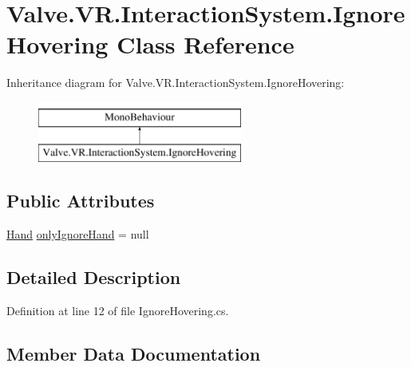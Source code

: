 \hypertarget{class_valve_1_1_v_r_1_1_interaction_system_1_1_ignore_hovering}{}\section{Valve.\+V\+R.\+Interaction\+System.\+Ignore\+Hovering Class Reference}
\label{class_valve_1_1_v_r_1_1_interaction_system_1_1_ignore_hovering}
Inheritance diagram for Valve.\+V\+R.\+Interaction\+System.\+Ignore\+Hovering\+:\begin{figure}[H]
\begin{center}
\leavevmode
\includegraphics[height=2.000000cm]{class_valve_1_1_v_r_1_1_interaction_system_1_1_ignore_hovering}
\end{center}
\end{figure}
\subsection*{Public Attributes}
\begin{DoxyCompactItemize}
\item 
\mbox{\hyperlink{class_valve_1_1_v_r_1_1_interaction_system_1_1_hand}{Hand}} \mbox{\hyperlink{class_valve_1_1_v_r_1_1_interaction_system_1_1_ignore_hovering_a3183d8970bee0d058f90ae449fe92970}{only\+Ignore\+Hand}} = null
\end{DoxyCompactItemize}


\subsection{Detailed Description}


Definition at line 12 of file Ignore\+Hovering.\+cs.



\subsection{Member Data Documentation}
\mbox{\label{class_valve_1_1_v_r_1_1_interaction_system_1_1_ignore_hovering_a3183d8970bee0d058f90ae449fe92970}} 
